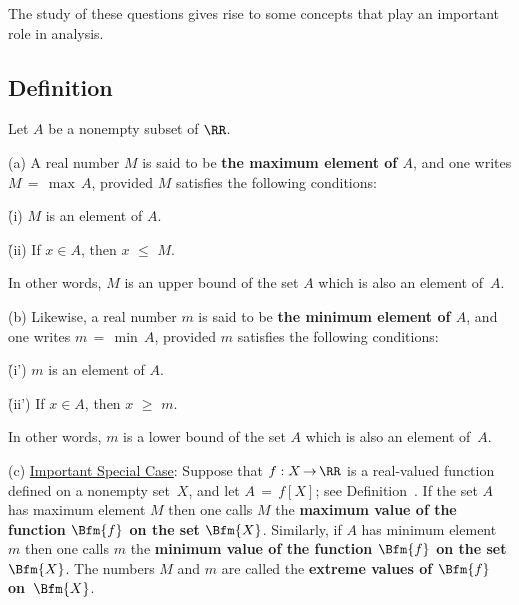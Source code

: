 \noindent The study of these questions gives rise to some concepts that play an important role in analysis.


\V
\V

            \subsection{\small{\bf Definition}}
            \label{DefB30.60}

        Let $A$ be a nonempty subset of ${\RR}$.

\V

        (a) A real number $M$ is said to be  {\bf the maximum element of $A$}, and one writes $M \,=\, \max\,A$, provided $M$ satisfies the following conditions:


        \h (i) $M$ is an element of $A$.

        \h (ii) If $x{\in}A$, then $x\,\,{\leq}\,\,M$.

\noindent In other words, $M$ is an upper bound of the set $A$ which is also an element of~$A$.

\V

        (b) Likewise, a real number $m$ is said to be {\bf the minimum element of $A$},
    and one writes $m \,=\, \min\,A$, provided $m$ satisfies the following conditions:


        \h (i') $m$ is an element of $A$.

        \h (ii') If $x{\in}A$, then $x\,\,{\geq}\,\,m$.

\noindent In other words, $m$ is a lower bound of the set $A$ which is also an element of~$A$.

\V

        (c) \underline{Important Special Case}:
    Suppose that $f:X \,{\rightarrow}\, {\RR}$ is a real-valued function defined on a nonempty set~$X$, and let $A \,=\, f[X]$; see Definition~. 
    If the set $A$ has maximum element $M$ then one calls $M$ the {\bf maximum value of the function $\Bfm{f}$ on the set $\Bfm{X}$}.
    Similarly, if $A$ has minimum element $m$ then one calls $m$ the {\bf minimum value of the function $\Bfm{f}$ on the set $\Bfm{X}$}.
    The numbers $M$ and $m$ are called the {\bf extreme values of $\Bfm{f}$ on~$\Bfm{X}$}.


